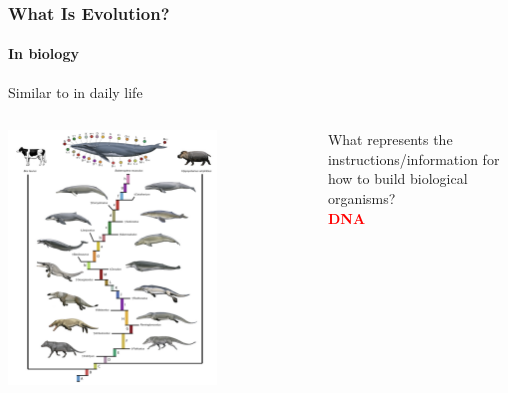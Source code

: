 \documentclass[10pt]{beamer}
\begin{document}
\begin{frame}[t]
\frametitle{What Is Evolution?}
\framesubtitle{In biology}
\vspace{0.5cm}

	Similar to in daily life\\
	
	\vspace{0.25cm}
	
	\begin{columns}[t]
		\begin{column}{0.6\textwidth}
			\begin{center}
				\includegraphics[width=0.7\textwidth]{figures/evolution.png}
			\end{center}
		\end{column}	
		
		\begin{column}{0.4\textwidth}
			\begin{center}
				\textcolor{myblue}{What represents the instructions/information for how to build biological organisms?}\\
				\vspace{0.5cm}
				\textcolor{red}{\textbf{DNA}}
			\end{center}
		\end{column}
	\end{columns}
\end{frame}
\end{document}
